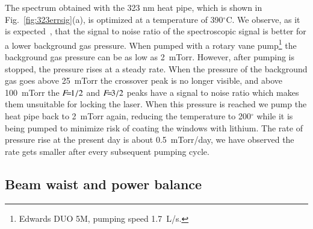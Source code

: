 \documentclass[oneside,12pt]{memoir}
\newcommand{\f}[1]{\ensuremath{F\hspace{-5pt}=\hspace{-4pt}#1}}
\begin{document}
The spectrum obtained with the 323 nm heat pipe, which is shown in
Fig.~\ref{fig:323errsig}(a), is optimized at a temperature of 390$^{\circ}$C.
We observe, as it is expected~\cite{Olivares1998}, that the signal to noise
ratio of the spectroscopic signal is better for a lower background gas
pressure.  When pumped with a rotary vane pump\footnote{Edwards  DUO 5M,
pumping speed 1.7~L/s.} the background gas pressure can be as low as 2~mTorr.
However, after pumping is stopped, the pressure rises at a steady rate.   When
the pressure of the background gas goes above 25~mTorr the crossover peak is no
longer visible, and above 100~mTorr the \f{1/2} and \f{3/2} peaks have a signal
to noise ratio which makes them unsuitable for locking the laser. When this
pressure is reached we pump the heat pipe back to 2~mTorr again,  reducing the
temperature to 200$^{\circ}$ while it is being pumped to minimize risk of
coating the windows with lithium.   The rate of pressure rise at the present
day is about 0.5~mTorr/day, we have observed the rate gets smaller after every
subsequent pumping cycle.  

\subsection{Beam waist and power balance}
\end{document}
